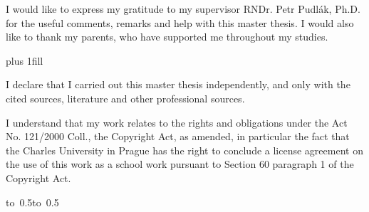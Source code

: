 \documentclass[12pt,a4paper]{report}
\begin{document}
\noindent
I would like to express my gratitude to my supervisor RNDr. Petr Pudlák, Ph.D.
for the useful comments, remarks and help with this master thesis.
I would also like to thank my parents, who have supported me throughout
my studies. 

\newpage


\vglue 0pt plus 1fill

\noindent
I declare that I carried out this master thesis independently, and only with the cited
sources, literature and other professional sources.

\medskip\noindent
I understand that my work relates to the rights and obligations under the Act No.
121/2000 Coll., the Copyright Act, as amended, in particular the fact that the Charles
University in Prague has the right to conclude a license agreement on the use of this
work as a school work pursuant to Section 60 paragraph 1 of the Copyright Act.

\vspace{10mm}

\hbox{\hbox to 0.5\hbox to 0.5}

\vspace{20mm}
\newpage


\end{document}
